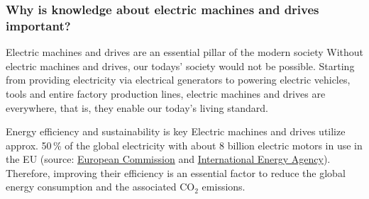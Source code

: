 \begin{frame}
	\frametitle{Why is knowledge about electric machines and drives important?}
	\begin{varblock}{Electric machines and drives are an essential pillar of the modern society}
		Without electric machines and drives, our todays' society would not be possible. Starting from providing electricity via electrical generators to powering electric vehicles, tools and entire factory production lines, electric machines and drives are everywhere, that is, they enable our today's living standard. 
	\end{varblock}
	\begin{varblock}{Energy efficiency and sustainability is key}
		Electric machines and drives utilize  approx. 50\,\% of the global electricity with about 8 billion electric motors in use in the EU (source: \href{https://commission.europa.eu/energy-climate-change-environment/standards-tools-and-labels/products-labelling-rules-and-requirements/energy-label-and-ecodesign/energy-efficient-products/electric-motors-and-variable-speed-drives_en}{European Commission} and \href{https://iea.blob.core.windows.net/assets/d69b2a76-feb9-4a74-a921-2490a8fefcdf/EE_for_ElectricSystems.pdf}{International Energy Agency}). Therefore, improving their efficiency is an essential factor to reduce the global energy consumption and the associated CO$_2$ emissions.
	\end{varblock}
\end{frame}

